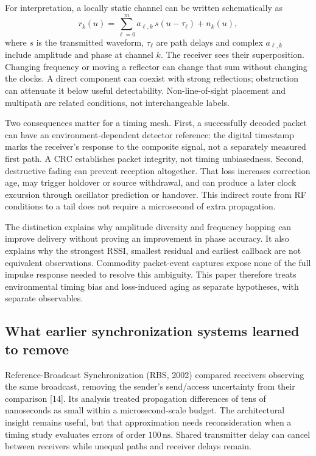 \documentclass[11pt,letterpaper]{article}
\newcommand{\ns}{\,\mathrm{ns}}\newcommand{\us}{\,\mu\mathrm{s}}\newcommand{\ms}{\,\mathrm{ms}}
\begin{document}
For interpretation, a locally static channel can be written schematically as
\[
 r_k(u)=\sum_{\ell=0}^{m} a_{\ell,k}\,s(u-\tau_\ell)+n_k(u),
\]
where $s$ is the transmitted waveform, $\tau_\ell$ are path delays and complex $a_{\ell,k}$ include amplitude and phase at channel $k$. The receiver sees their superposition. Changing frequency or moving a reflector can change that sum without changing the clocks. A direct component can coexist with strong reflections; obstruction can attenuate it below useful detectability. Non-line-of-sight placement and multipath are related conditions, not interchangeable labels.

Two consequences matter for a timing mesh. First, a successfully decoded packet can have an environment-dependent detector reference: the digital timestamp marks the receiver's response to the composite signal, not a separately measured first path. A CRC establishes packet integrity, not timing unbiasedness. Second, destructive fading can prevent reception altogether. That loss increases correction age, may trigger holdover or source withdrawal, and can produce a later clock excursion through oscillator prediction or handover. This indirect route from RF conditions to a tail does not require a microsecond of extra propagation.

The distinction explains why amplitude diversity and frequency hopping can improve delivery without proving an improvement in phase accuracy. It also explains why the strongest RSSI, smallest residual and earliest callback are not equivalent observations. Commodity packet-event captures expose none of the full impulse response needed to resolve this ambiguity. This paper therefore treats environmental timing bias and loss-induced aging as separate hypotheses, with separate observables.

\subsection{What earlier synchronization systems learned to remove}
Reference-Broadcast Synchronization (RBS, 2002) compared receivers observing the same broadcast, removing the sender's send/access uncertainty from their comparison [14]. Its analysis treated propagation differences of tens of nanoseconds as small within a microsecond-scale budget. The architectural insight remains useful, but that approximation needs reconsideration when a timing study evaluates errors of order $100\ns$. Shared transmitter delay can cancel between receivers while unequal paths and receiver delays remain.
\end{document}
